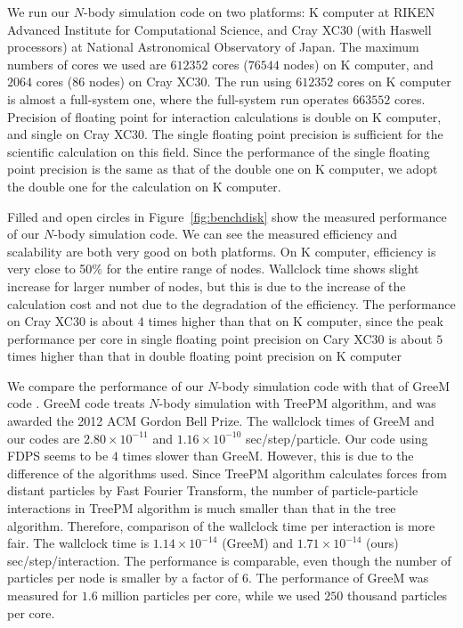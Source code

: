 We run our $N$-body simulation code on two platforms: K computer at
RIKEN Advanced Institute for Computational Science, and Cray XC30
(with Haswell processors) at National Astronomical Observatory of
Japan. The maximum numbers of cores we used are $612352$ cores
($76544$ nodes) on K computer, and $2064$ cores ($86$ nodes) on Cray
XC30. The run using $612352$ cores on K computer is almost a
full-system one, where the full-system run operates $663552$ cores.
Precision of floating point for interaction calculations is double on
K computer, and single on Cray XC30. The single floating point
precision is sufficient for the scientific calculation on this
field. Since the performance of the single floating point precision is
the same as that of the double one on K computer, we adopt the double
one for the calculation on K computer.

Filled and open circles in Figure~\ref{fig:benchdisk} show the
measured performance of our $N$-body simulation code. We can see the
measured efficiency and scalability are both very good on both
platforms. On K computer, efficiency is very close to 50\% for the
entire range of nodes. Wallclock time shows slight increase for larger
number of nodes, but this is due to the increase of the calculation
cost and not due to the degradation of the efficiency. The performance
on Cray XC30 is about $4$ times higher than that on K computer, since
the peak performance per core in single floating point precision on
Cary XC30 is about $5$ times higher than that in double floating point
precision on K computer

We compare the performance of our $N$-body simulation code with that
of GreeM code \cite{ishiyama:greem, ishiyama:gordonbell}. GreeM code
treats $N$-body simulation with TreePM algorithm, and was awarded the
2012 ACM Gordon Bell Prize. The wallclock times of GreeM and our codes
are $2.80 \times 10^{-11}$ and $1.16 \times 10^{-10}$
sec/step/particle. Our code using FDPS seems to be $4$ times slower
than GreeM. However, this is due to the difference of the algorithms
used. Since TreePM algorithm calculates forces from distant particles
by Fast Fourier Transform, the number of particle-particle
interactions in TreePM algorithm is much smaller than that in the tree
algorithm. Therefore, comparison of the wallclock time per interaction
is more fair. The wallclock time is $1.14 \times 10^{-14}$ (GreeM) and
$1.71 \times 10^{-14}$ (ours) sec/step/interaction. The performance is
comparable, even though the number of particles per node is smaller by
a factor of $6$. The performance of GreeM was measured for
$1.6$ million particles per core, while we used $250$ thousand
particles per core.

